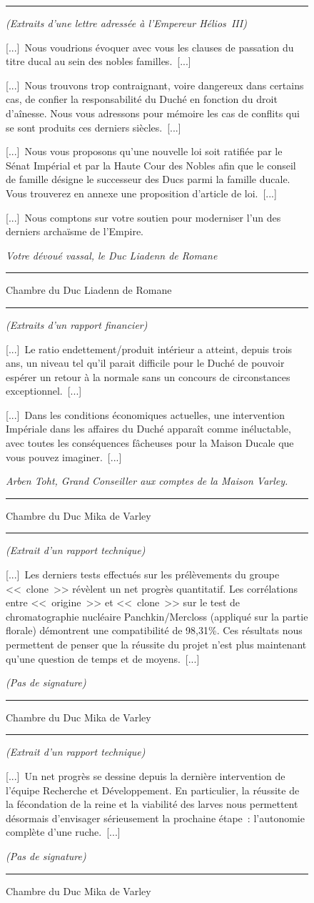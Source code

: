 \documentclass{article}
\newcommand{\newcharacter}{\clearpage\setcounter{figure}{0}}
\newcommand{\indice}[4]{
  \begin{figure}[H]
    \begin{center}
      \rule{0.5\textwidth}{1pt}
    \end{center}
    \begin{framed}
      \begin{samepage}
        \textit{#1}
        \nopagebreak

        #2

        \nopagebreak

        \hfill\textit{#3}
      \end{samepage}
    \end{framed}
    \caption{#4}
    \begin{center}
      \rule{0.5\textwidth}{1pt}
    \end{center}
  \end{figure}
}
\begin{document}
\indice
{(Extraits d'une lettre adressée à l'Empereur Hélios~III)}
{[...]~Nous voudrions évoquer avec vous les clauses de passation du titre ducal
au sein des nobles familles.~[...]

\nobreak

[...]~Nous trouvons trop contraignant, voire dangereux dans certains cas, de
confier la responsabilité du Duché en fonction du droit d'aînesse. Nous vous
adressons pour mémoire les cas de conflits qui se sont produits ces derniers
siècles.~[...]

\nobreak

[...]~Nous vous proposons qu'une nouvelle loi soit ratifiée par le Sénat
Impérial et par la Haute Cour des Nobles afin que le conseil de famille désigne
le successeur des Ducs parmi la famille ducale. Vous trouverez en annexe une
proposition d'article de loi.~[...]

\nobreak

[...]~Nous comptons sur votre soutien pour moderniser l'un des derniers
archaïsme de l'Empire.}
{Votre dévoué vassal, le Duc Liadenn de Romane}
{Chambre du Duc Liadenn de Romane}

\newcharacter

\indice
{(Extraits d'un rapport financier)}
{[...]~Le ratio endettement/produit intérieur a atteint, depuis trois ans, un
niveau tel qu'il parait difficile pour le Duché de pouvoir espérer un retour à
la normale sans un concours de circonstances exceptionnel.~[...]

\nobreak

[...]~Dans les conditions économiques actuelles, une intervention Impériale
dans les affaires du Duché apparaît comme inéluctable, avec toutes les
conséquences fâcheuses pour la Maison Ducale que vous pouvez imaginer.~[...]}
{Arben Toht, Grand Conseiller aux comptes de la Maison Varley.}
{Chambre du Duc Mika de Varley}

\indice
{(Extrait d'un rapport technique)}
{[...]~Les derniers tests effectués sur les prélèvements du groupe <<~clone~>>
révèlent un net progrès quantitatif. Les corrélations entre <<~origine~>> et
<<~clone~>> sur le test de chromatographie nucléaire Panchkin/Mercloss
(appliqué sur la partie florale) démontrent une compatibilité de 98,31\%. Ces
résultats nous permettent de penser que la réussite du projet n'est plus
maintenant qu'une question de temps et de moyens.~[...]}
{(Pas de signature)}
{Chambre du Duc Mika de Varley}

\indice
{(Extrait d'un rapport technique)}
{[...]~Un net progrès se dessine depuis la dernière intervention de l'équipe
Recherche et Développement. En particulier, la réussite de la fécondation de la
reine et la viabilité des larves nous permettent désormais d'envisager
sérieusement la prochaine étape~: l'autonomie complète d'une ruche.~[...]}
{(Pas de signature)}
{Chambre du Duc Mika de Varley}
\end{document}
